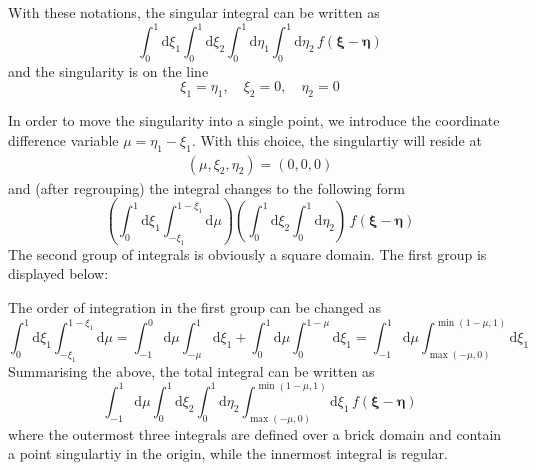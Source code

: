 \documentclass{article}
\newcommand{\td}{\mathrm{d}}
\newcommand{\td}{\mathrm{d}}
\begin{document}
With these notations, the singular integral can be written as
%
\begin{equation}
\int_{0}^{1} \td \xi_1
\int_{0}^{1} \td \xi_2
\int_{0}^{1} \td \eta_1
\int_{0}^{1} \td \eta_2
\, f(\bm{\xi}-\bm{\eta})
\end{equation}
%
and the singularity is on the line
%
\begin{equation}
\xi_1 = \eta_1, \quad
\xi_2 = 0, \quad
\eta_2 = 0
\end{equation}

In order to move the singularity into a single point, we introduce the coordinate difference variable $\mu = \eta_1-\xi_1$. With this choice, the singulartiy will reside at
%
\begin{align}
(\mu, \xi_2, \eta_2) = (0, 0, 0)
\end{align}
%
and (after regrouping) the integral changes to the following form
%
\begin{equation}
\left(
\int_{0}^{1} \td \xi_1
\int_{-\xi_1}^{1-\xi_1} \td \mu
\right)
\left(
\int_{0}^{1} \td \xi_2
\int_{0}^{1} \td \eta_2
\right)
\, f(\bm{\xi}-\bm{\eta})
\end{equation}
%
The second group of integrals is obviously a square domain. The first group is displayed below:


The order of integration in the first group can be changed as
%
\begin{equation}
\int_{0}^{1} \td \xi_1
\int_{-\xi_1}^{1-\xi_1} \td \mu
=
\int_{-1}^{0} \td \mu
\int_{-\mu}^{1} \td \xi_1
+
\int_{0}^{1} \td \mu
\int_{0}^{1-\mu} \td \xi_1
=
\int_{-1}^{1} \td \mu
\int_{\max(-\mu,0)}^{\min(1-\mu,1)} \td \xi_1
\end{equation}
%
Summarising the above, the total integral can be written as
%
\begin{equation}
\int_{-1}^{1} \td \mu
\int_{0}^{1} \td \xi_2
\int_{0}^{1} \td \eta_2
\int_{\max(-\mu,0)}^{\min(1-\mu,1)} \td \xi_1
\, f(\bm{\xi}-\bm{\eta})
\end{equation}
%
where the outermost three integrals are defined over a brick domain and contain a point singulartiy in the origin, while the innermost integral is regular.
\end{document}
